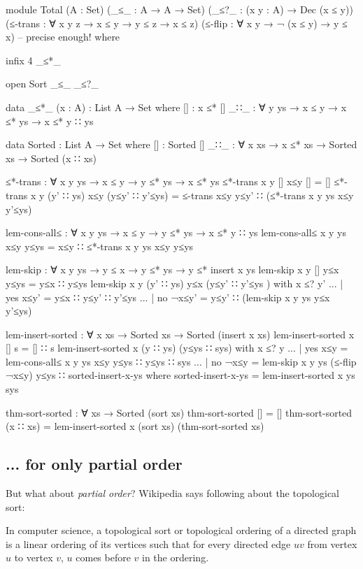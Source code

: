 \begin{code}
module Total (A : Set) (_≤_ : A → A → Set)
  (_≤?_ : (x y : A) → Dec (x ≤ y))
  (≤-trans : ∀ {x y z} → x ≤ y → y ≤ z → x ≤ z)
  (≤-flip  : ∀ {x y} → ¬ (x ≤ y) → y ≤ x) -- precise enough!
  where

  infix 4 _≤*_

  open Sort _≤_ _≤?_

  data _≤*_ (x : A) : List A → Set where
    []  : x ≤* []
    _∷_ : ∀ {y ys} → x ≤ y → x ≤* ys → x ≤* y ∷ ys

  data Sorted : List A → Set where
    [] : Sorted []
    _∷_ : ∀ {x xs} → x ≤* xs → Sorted xs → Sorted (x ∷ xs)

  ≤*-trans :  ∀ x y ys → x ≤ y → y ≤* ys → x ≤* ys
  ≤*-trans x y []        x≤y []             = []
  ≤*-trans x y (y' ∷ ys) x≤y (y≤y' ∷ y'≤ys) =
    ≤-trans x≤y y≤y' ∷ (≤*-trans x y ys x≤y y'≤ys)

  lem-cons-all≤ : ∀ x y ys → x ≤ y → y ≤* ys → x ≤* y ∷ ys
  lem-cons-all≤ x y ys x≤y y≤ys = x≤y ∷ ≤*-trans x y ys x≤y y≤ys

  lem-skip : ∀ x y ys → y ≤ x → y ≤* ys → y ≤* insert x ys
  lem-skip x y []        y≤x y≤ys        = y≤x ∷ y≤ys
  lem-skip x y (y' ∷ ys) y≤x (y≤y' ∷ y'≤ys ) with x ≤? y'
  ... | yes x≤y' = y≤x ∷ y≤y' ∷ y'≤ys
  ... | no ¬x≤y' = y≤y' ∷ (lem-skip x y ys y≤x y'≤ys)

  lem-insert-sorted : ∀ x xs → Sorted xs → Sorted (insert x xs)
  lem-insert-sorted x [] s = [] ∷ s
  lem-insert-sorted x (y ∷ ys) (y≤ys ∷ sys) with x ≤? y
  ... | yes x≤y = lem-cons-all≤ x y ys x≤y y≤ys ∷ y≤ys ∷ sys
  ... | no ¬x≤y = lem-skip x y ys (≤-flip ¬x≤y) y≤ys ∷ sorted-insert-x-ys
    where sorted-insert-x-ys = lem-insert-sorted x ys sys

  thm-sort-sorted : ∀ xs → Sorted (sort xs)
  thm-sort-sorted []       = []
  thm-sort-sorted (x ∷ xs) =
    lem-insert-sorted x (sort xs) (thm-sort-sorted xs)
\end{code}

\subsection{... for only partial order}

But what about \emph{partial order}? Wikipedia says following about the topological
sort:

In computer science, a topological sort or topological ordering of
a directed graph is a linear ordering of its vertices such that for every
directed edge $uv$ from vertex $u$ to vertex $v$, $u$ comes before $v$ in the
ordering.

